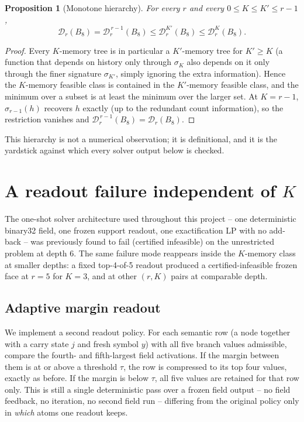 \documentclass[11pt,a4paper]{article}
\newtheorem{proposition}{Proposition}
\newcommand{\D}{\mathscr D}
\begin{document}
\begin{proposition}[Monotone hierarchy]
For every $r$ and every $0\le K \le K' \le r-1$,
\[
\D_r(B_8) = \D_r^{\,r-1}(B_8) \le \D_r^{K'}(B_8) \le \D_r^{K}(B_8).
\]
\end{proposition}

\begin{proof}
Every $K$-memory tree is in particular a $K'$-memory tree for $K'\ge K$ (a
function that depends on history only through $\sigma_K$ also depends on it
only through the finer signature $\sigma_{K'}$, simply ignoring the extra
information). Hence the $K$-memory feasible class is contained in the
$K'$-memory feasible class, and the minimum over a subset is at least the
minimum over the larger set. At $K=r-1$, $\sigma_{r-1}(h)$ recovers $h$
exactly (up to the redundant count information), so the restriction vanishes
and $\D_r^{\,r-1}(B_8) = \D_r(B_8)$.
\end{proof}

This hierarchy is not a numerical observation; it is definitional, and it is
the yardstick against which every solver output below is checked.

\section{A readout failure independent of \texorpdfstring{$K$}{K}}

The one-shot solver architecture used throughout this project -- one
deterministic binary32 field, one frozen support readout, one exactification
LP with no add-back -- was previously found to fail (certified infeasible) on
the unrestricted problem at depth 6. The same failure mode reappears inside
the $K$-memory class at smaller depths: a fixed top-4-of-5 readout produced a
certified-infeasible frozen face at $r=5$ for $K=3$, and at other
$(r,K)$ pairs at comparable depth.

\subsection{Adaptive margin readout}

We implement a second readout policy. For each semantic row (a node together
with a carry state $j$ and fresh symbol $y$) with all five branch values
admissible, compare the fourth- and fifth-largest field activations. If the
margin between them is at or above a threshold $\tau$, the row is compressed
to its top four values, exactly as before. If the margin is below $\tau$, all
five values are retained for that row only. This is still a single
deterministic pass over a frozen field output -- no field feedback, no
iteration, no second field run -- differing from the original policy only in
\emph{which} atoms one readout keeps.
\end{document}
